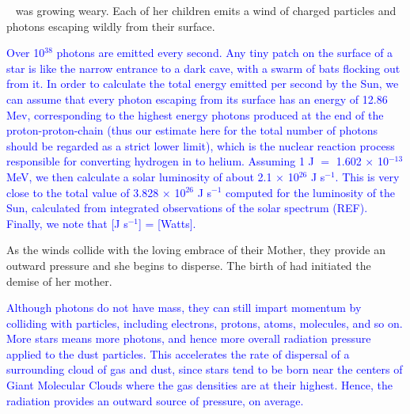 \documentclass[main.tex]{subfiles}
\begin{document}
\par \nar \rmpleione~ was growing weary.  Each of her children emits a wind of charged particles and photons escaping wildly from their surface.

\begin{tcolorbox}[sharp corners, colback=blue!30, colframe=blue!80!blue, title=Stellar luminosity]
\par \textcolor{blue} {Over 10$^{38}$ photons are emitted every second.  Any tiny patch on the surface of a star is like the narrow entrance to a dark cave, with a swarm of bats flocking out from it.  In order to calculate the total energy emitted per second by the Sun, we can assume that every photon escaping from its surface has an energy of 12.86 Mev, corresponding to the highest energy photons produced at the end of the proton-proton-chain (thus our estimate here for the total number of photons should be regarded as a strict lower limit), which is the nuclear reaction process responsible for converting hydrogen in to helium.  Assuming 1 J $=$ 1.602 $\times$ 10$^{-13}$ MeV, we then calculate a solar luminosity of about 2.1 ${\times}$ 10$^{26}$ J s$^{-1}$.  This is very close to the total value of 3.828 $\times$ 10$^{26}$ J s$^{-1}$ computed for the luminosity of the Sun, calculated from integrated observations of the solar spectrum (REF). Finally, we note that [J s$^{-1}$] = [Watts].}  
\end{tcolorbox}

\par \nar As the winds collide with the loving embrace of their Mother, they provide an outward pressure and she begins to disperse.  The birth of \rmmaia had initiated the demise of her mother.  

\begin{tcolorbox}[sharp corners, colback=blue!30, colframe=blue!80!blue, title=Radiation Pressure]
\par \textcolor{blue} {Although photons do not have mass, they can still impart momentum by colliding with particles, including electrons, protons, atoms, molecules, and so on.  More stars means more photons, and hence more overall radiation pressure applied to the dust particles.  This accelerates the rate of dispersal of a surrounding cloud of gas and dust, since stars tend to be born near the centers of Giant Molecular Clouds where the gas densities are at their highest.  Hence, the radiation provides an outward source of pressure, on average.}  %
\end{tcolorbox}
\end{document}

